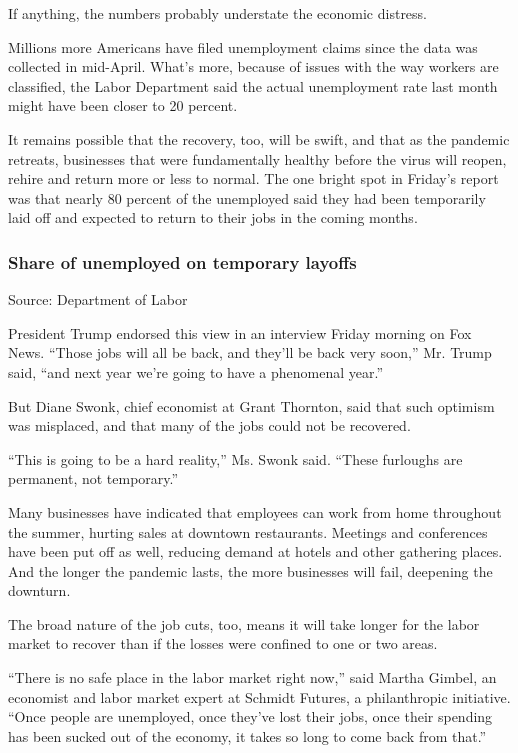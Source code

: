 If anything, the numbers probably understate the economic distress.

Millions more Americans have filed unemployment claims since the data
was collected in mid-April. What's more, because of issues with the way
workers are classified, the Labor Department said the actual
unemployment rate last month might have been closer to 20 percent.

It remains possible that the recovery, too, will be swift, and that as
the pandemic retreats, businesses that were fundamentally healthy before
the virus will reopen, rehire and return more or less to normal. The one
bright spot in Friday's report was that nearly 80 percent of the
unemployed said they had been temporarily laid off and expected to
return to their jobs in the coming months.

\hypertarget{share-of-unemployed-on-temporary-layoffs}{%
\subsubsection{Share of unemployed on temporary
layoffs}\label{share-of-unemployed-on-temporary-layoffs}}

Source: Department of Labor

President Trump endorsed this view in an interview Friday morning on Fox
News. ``Those jobs will all be back, and they'll be back very soon,''
Mr. Trump said, ``and next year we're going to have a phenomenal year.''

But Diane Swonk, chief economist at Grant Thornton, said that such
optimism was misplaced, and that many of the jobs could not be
recovered.

``This is going to be a hard reality,'' Ms. Swonk said. ``These
furloughs are permanent, not temporary.''

Many businesses have indicated that employees can work from home
throughout the summer, hurting sales at downtown restaurants. Meetings
and conferences have been put off as well, reducing demand at hotels and
other gathering places. And the longer the pandemic lasts, the more
businesses will fail, deepening the downturn.

The broad nature of the job cuts, too, means it will take longer for the
labor market to recover than if the losses were confined to one or two
areas.

``There is no safe place in the labor market right now,'' said Martha
Gimbel, an economist and labor market expert at Schmidt Futures, a
philanthropic initiative. ``Once people are unemployed, once they've
lost their jobs, once their spending has been sucked out of the economy,
it takes so long to come back from that.''

